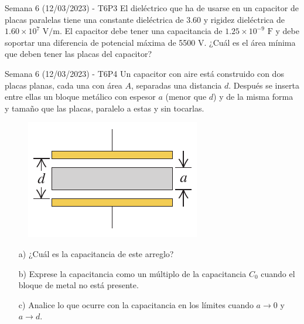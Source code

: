 \begin{frame}{Semana 6 (12/03/2023) - T6P3}
    El dieléctrico que ha de usarse en un capacitor de placas paralelas tiene una constante dieléctrica de 3.60 y rigidez dieléctrica de $1.60\times10^7 \text{ V}/\text{m}$. El capacitor debe tener una capacitancia de $1.25\times10^{-9} \text{ F}$ y debe soportar una diferencia de potencial máxima de 5500 V. ¿Cuál es el área mínima que deben tener las placas del capacitor?
    
\end{frame}

\begin{frame}{Semana 6 (12/03/2023) - T6P4}
    Un capacitor con aire está construido con dos placas planas, cada una con área $A$, separadas una distancia $d$. Después se inserta entre ellas un bloque metálico con espesor $a$ (menor que $d$) y de la misma forma y tamaño que las placas, paralelo a estas y sin tocarlas.

    \begin{figure}[H]
        \centering
        \includegraphics[scale=0.5]{figures/t6p4.png}
    \end{figure}
    
    \begin{itemize}
        \item[a)] ¿Cuál es la capacitancia de este arreglo?
        \item[b)] Exprese la capacitancia como un múltiplo de la capacitancia $C_0$ cuando el bloque de metal no está presente.
        \item[c)] Analice lo que ocurre con la capacitancia en los límites cuando $a\rightarrow0$ y $a\rightarrow d$.
    \end{itemize}
\end{frame}


